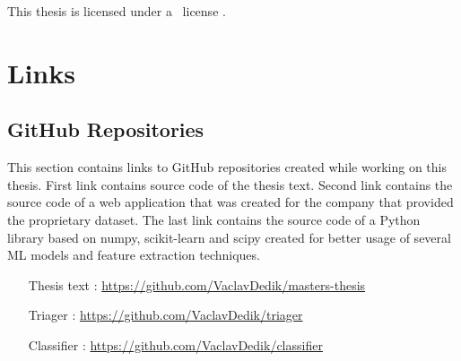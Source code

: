 \documentclass[nopalatino,nolot,nolof,color]{fithesis3}
\begin{document}
 \makeatletter
  \thesis@blocks@cover
  \thesis@blocks@titlePage
  \thesis@blocks@frontMatter
  \begin{center}
    \begin{minipage}{\textwidth}
      This thesis is licensed under a \doclicenseLongNameRef~license \doclicenseIcon.%
    \end{minipage}
  \end{center}
  \thesis@blocks@assignment
  \thesis@blocks@declaration
  \thesis@blocks@thanks
  \thesis@blocks@clearRight
  \thesis@blocks@abstract
  \thesis@blocks@keywords
  \thesis@blocks@tables
  \thesis@blocks@mainMatter
 \makeatother

 
 
 
 
 
 
 

 
 

 \appendix
 \chapter{Links}

 \section{GitHub Repositories}

 This section contains links to GitHub repositories created while working on this thesis. First link contains source code of the thesis text. Second link contains the source code of a web application that was created for the company that provided the proprietary dataset. The last link contains the source code of a Python library based on numpy, scikit-learn and scipy created for better usage of several ML models and feature extraction techniques.

 \begin{itemize}
   \item[Thesis text]: \url{https://github.com/VaclavDedik/masters-thesis}
   \item[Triager]: \url{https://github.com/VaclavDedik/triager}
   \item[Classifier]: \url{https://github.com/VaclavDedik/classifier}
 \end{itemize}

 \todos
\end{document}
